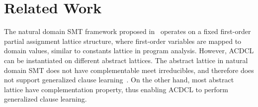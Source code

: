 \section{Related Work}
The natural domain SMT framework proposed in~\cite{ndsmt} operates on
a fixed first-order partial assignment lattice structure, where first-order 
variables are mapped to domain values, similar to constants lattice 
in program analysis.  However, ACDCL can be instantiated on different 
abstract lattices.  The abstract lattice in natural domain SMT does 
not have complementable meet irreducibles, and therefore does not 
support generalized clause learning~\cite{sas}.  On the other hand, 
most abstract lattice have complementation property, thus enabling 
ACDCL to perform generalized clause learning.
